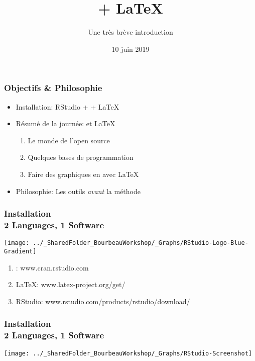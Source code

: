 \documentclass{beamer}
\title{\R + \LaTeX}
\subtitle{Une très brève introduction}
\date{10 juin 2019}
\begin{document}

	\frame{\titlepage}



    \begin{frame}
        \frametitle{Objectifs \& Philosophie}
        \begin{itemize}
            \item<2-> Installation:  RStudio + \R + \LaTeX
            \item<3-> Résumé de la journée: \R et \LaTeX
                      \begin{enumerate}
                        \item Le monde de l'open source
                        \item Quelques bases de programmation \R
                        \item Faire des graphiques en \R avec \LaTeX
                      \end{enumerate}
            \item<4-> Philosophie: Les outils \emph{avant} la méthode
        \end{itemize}
    \end{frame}

   \begin{frame}
            \frametitle{Installation \\ \vspace{0.2cm} 2 Languages, 1 Software}
            \vspace{0.5cm}
            \begin{center}
              \texttt{[image: ../\_SharedFolder\_BourbeauWorkshop/\_Graphs/RStudio-Logo-Blue-Gradient]}
            \end{center} 
            \begin{enumerate}
                \item<2-> \R: www.cran.rstudio.com
                \item<3-> \LaTeX: www.latex-project.org/get/
                \item<4-> RStudio: www.rstudio.com/products/rstudio/download/
            \end{enumerate}
    \end{frame}
    
    \begin{frame}
            \frametitle{Installation \\ \vspace{0.2cm} 2 Languages, 1 Software}
            \vspace{2.3cm}
            \begin{center}
              \texttt{[image: ../\_SharedFolder\_BourbeauWorkshop/\_Graphs/RStudio-Screenshot]}
            \end{center} 
    \end{frame}
\end{document}
